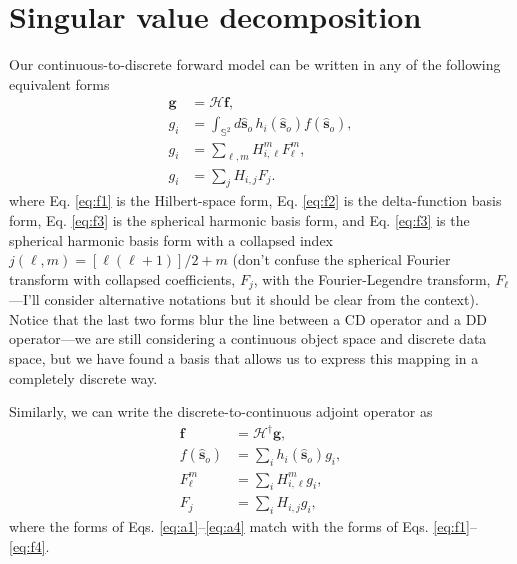 \documentclass[11pt]{article}
\providecommand{\mb}[1]{\mathbf{#1}}
\providecommand{\mc}[1]{\mathcal{#1}}
\providecommand{\so}{\mathbf{\hat{s}}_o}
\providecommand{\mbb}[1]{\mathbb{#1}}
\providecommand{\ints}[1]{\int_{\mbb{S}^{#1}}}
\begin{document}
\section{Singular value decomposition}
Our continuous-to-discrete forward model can be written in any of the following
equivalent forms
\begin{align}
  \mb{g} &= \mc{H}\mb{f},\label{eq:f1}\\
  g_i &= \ints{2}d\so\,h_i(\so)f(\so),\label{eq:f2}\\
  g_i &= \sum_{\ell,m}H_{i,\ell}^m F_{\ell}^m,\label{eq:f3}\\
  g_i &= \sum_{j}H_{i,j}F_j.\label{eq:f4}
\end{align}
where Eq. \eqref{eq:f1} is the Hilbert-space form, Eq. \eqref{eq:f2} is the
delta-function basis form, Eq. \eqref{eq:f3} is the spherical harmonic basis
form, and Eq. \eqref{eq:f3} is the spherical harmonic basis form with a
collapsed index $j(\ell,m) = [\ell(\ell+1)]/2 + m$ (don't confuse the spherical
Fourier transform with collapsed coefficients, $F_j$, with the Fourier-Legendre
transform, $F_\ell$---I'll consider alternative notations but it should be clear
from the context). Notice that the last two forms blur the line between a CD
operator and a DD operator---we are still considering a continuous object space
and discrete data space, but we have found a basis that allows us to express
this mapping in a completely discrete way.

Similarly, we can write the discrete-to-continuous adjoint operator as
\begin{align}
  \mb{f} &= \mc{H}^{\dagger}\mb{g},\label{eq:a1}\\
  f(\so) &= \sum_i h_i(\so)g_i,\label{eq:a2}\\
  F_{\ell}^m &= \sum_{i} H_{i,\ell}^m g_i,\label{eq:a3}\\
  F_j &= \sum_i H_{i,j}g_i,\label{eq:a4}
\end{align}
where the forms of Eqs. \eqref{eq:a1}--\eqref{eq:a4} match with the forms of Eqs. \eqref{eq:f1}--\eqref{eq:f4}.
\end{document}
